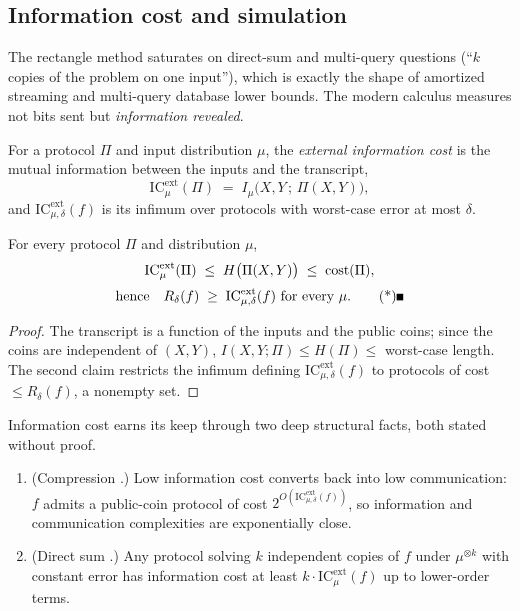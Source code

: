 \subsection{Information cost and simulation}
\label{sec:cc-ic}

The rectangle method saturates on direct-sum and multi-query questions (``$k$ copies
of the problem on one input''), which is exactly the shape of amortized streaming and
multi-query database lower bounds. The modern calculus measures not bits sent but
\emph{information revealed}.

\begin{definition}\label{def:cc-ic}
For a protocol $\Pi$ and input distribution $\mu$, the \emph{external information
cost} is the mutual information between the inputs and the transcript,
\[
\mathrm{IC}^{\mathrm{ext}}_\mu(\Pi) \;=\;
I_\mu\bigl(X,Y \,;\, \Pi(X,Y)\bigr),
\]
and $\mathrm{IC}^{\mathrm{ext}}_{\mu,\delta}(f)$ is its infimum over protocols with
worst-case error at most $\delta$.
\end{definition}

\begin{proposition}\label{pro:cc-icbound}
For every protocol $\Pi$ and distribution $\mu$,
\begin{gather*}
\mathrm{IC}^{\mathrm{ext}}_\mu(\Pi) \;\le\; H\bigl(\Pi(X,Y)\bigr) \;\le\;
\operatorname{cost}(\Pi),\\[2pt]
\text{hence}\quad
R_\delta(f) \;\ge\; \mathrm{IC}^{\mathrm{ext}}_{\mu,\delta}(f)
\text{ for every } \mu. \eopm
\end{gather*}
\end{proposition}

\begin{proof}
The transcript is a function of the inputs and the public coins; since the coins are
independent of $(X,Y)$, $I(X,Y;\Pi) \le H(\Pi) \le$ worst-case length. The second claim
restricts the infimum defining $\mathrm{IC}^{\mathrm{ext}}_{\mu,\delta}(f)$ to
protocols of cost $\le R_\delta(f)$, a nonempty set.
\end{proof}

Information cost earns its keep through two deep structural facts, both stated
without proof.

\begin{theorem}\label{thm:cc-sim}
\begin{enumerate}
\item[(i)] (Compression \citep{communication-complexity-bg11}.) Low information cost
converts back into low communication: $f$ admits a public-coin protocol of cost
$2^{O(\mathrm{IC}^{\mathrm{ext}}_{\mu,\delta}(f))}$, so information and communication
complexities are exponentially close.
\item[(ii)] (Direct sum \citep{communication-complexity-bg5,
communication-complexity-bg10}.) Any protocol solving $k$ independent copies of $f$
under $\mu^{\otimes k}$ with constant error has information cost at least
$k \cdot \mathrm{IC}^{\mathrm{ext}}_{\mu}(f)$ up to lower-order terms.
\end{enumerate}
\eop
\end{theorem}

